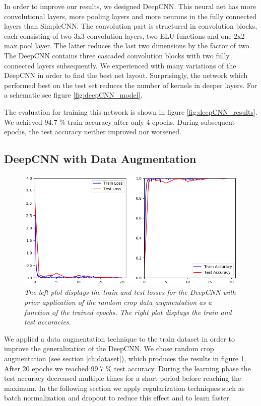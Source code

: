 \documentclass[a4paper]{article}
\begin{document}
In order to improve our results, we designed DeepCNN. This neural net has more convolutional layers, more pooling layers and more neurons in the fully connected layers than SimpleCNN. The convolution part is structured in convolution blocks, each consisting of two 3x3 convolution layers, two ELU functions and one 2x2 max pool layer. The latter reduces the last two dimensions by the factor of two. The DeepCNN contains three cascaded convolution blocks with two fully connected layers subsequently. We experienced with many variations of the DeepCNN in order to find the best net layout. Surprisingly, the network which performed best on the test set reduces the number of kernels in deeper layers. For a schematic see figure \ref{fig:deepCNN_model}. 

The evaluation for training this network is shown in figure \ref{fig:deepCNN_results}. We achieved 94.7 \% train accuracy after only 4 epochs. During subsequent epochs, the test accuracy neither improved nor worsened. 

\subsection{DeepCNN with Data Augmentation}\label{sec:deepCNN_augmented}

\begin{figure}
     \centering
     \includegraphics[height=0.25\paperwidth]{graphics/nets/CNN13_with_Augmentation_Results}
     \caption{\textit{The left plot displays the train and test losses for the DeepCNN with prior application of the random crop data augmentation as a function of the trained epochs. The right plot displays the train and test accuracies.}}
     \label{fig:deepCNN_augmented}
\end{figure}

We applied a data augmentation technique to the train dataset in order to improve the generalization of the DeepCNN. We chose random crop augmentation (see section \ref{ch:dataset}), which produces the results in figure \ref{fig:deepCNN_augmented}. After 20 epochs we reached 99.7 \% test accuracy. During the learning phase the test accuracy decreased multiple times for a short period before reaching the maximum. In the following section we apply regularization techniques such as batch normalization and dropout to reduce this effect and to learn faster. 
\end{document}
